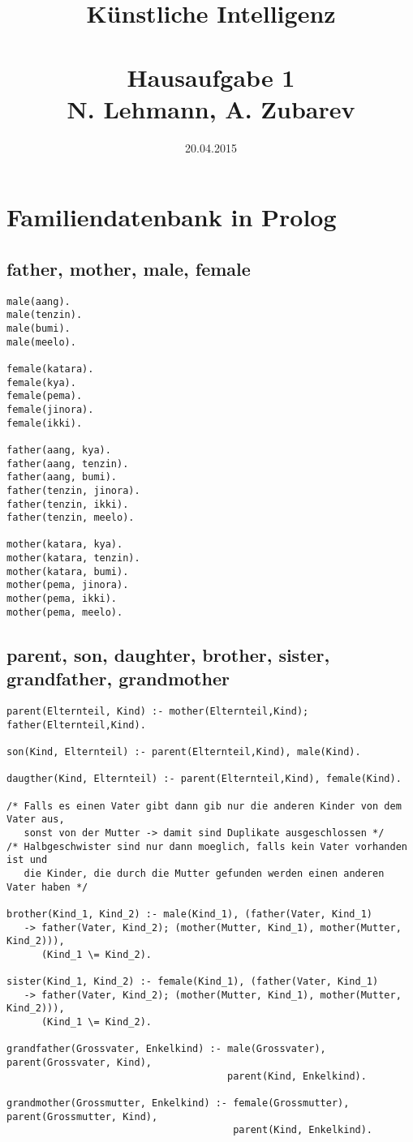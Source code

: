 \documentclass{article}
\title{Künstliche Intelligenz\\~\\Hausaufgabe 1\\ \small{N. Lehmann, A. Zubarev}}
\date{20.04.2015}
\begin{document}
\maketitle

\section{Familiendatenbank in Prolog}

\subsection{father, mother, male, female}

\begin{verbatim}
male(aang).
male(tenzin).
male(bumi).
male(meelo).

female(katara).
female(kya).
female(pema).
female(jinora).
female(ikki).

father(aang, kya).
father(aang, tenzin).
father(aang, bumi).
father(tenzin, jinora).
father(tenzin, ikki).
father(tenzin, meelo).

mother(katara, kya).
mother(katara, tenzin).
mother(katara, bumi).
mother(pema, jinora).
mother(pema, ikki).
mother(pema, meelo).
\end{verbatim}

\subsection{parent, son, daughter, brother, sister, grandfather, grandmother}

\begin{verbatim}
parent(Elternteil, Kind) :- mother(Elternteil,Kind); father(Elternteil,Kind).

son(Kind, Elternteil) :- parent(Elternteil,Kind), male(Kind).

daugther(Kind, Elternteil) :- parent(Elternteil,Kind), female(Kind).

/* Falls es einen Vater gibt dann gib nur die anderen Kinder von dem Vater aus,
   sonst von der Mutter -> damit sind Duplikate ausgeschlossen */
/* Halbgeschwister sind nur dann moeglich, falls kein Vater vorhanden ist und
   die Kinder, die durch die Mutter gefunden werden einen anderen Vater haben */

brother(Kind_1, Kind_2) :- male(Kind_1), (father(Vater, Kind_1)
   -> father(Vater, Kind_2); (mother(Mutter, Kind_1), mother(Mutter, Kind_2))),
      (Kind_1 \= Kind_2).

sister(Kind_1, Kind_2) :- female(Kind_1), (father(Vater, Kind_1)
   -> father(Vater, Kind_2); (mother(Mutter, Kind_1), mother(Mutter, Kind_2))),
      (Kind_1 \= Kind_2).

grandfather(Grossvater, Enkelkind) :- male(Grossvater), parent(Grossvater, Kind),
                                      parent(Kind, Enkelkind).

grandmother(Grossmutter, Enkelkind) :- female(Grossmutter), parent(Grossmutter, Kind),
                                       parent(Kind, Enkelkind).
\end{verbatim}
\end{document}
